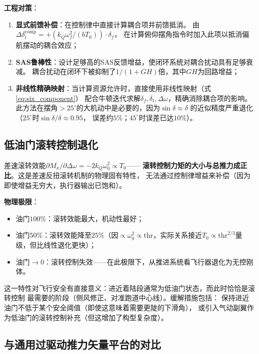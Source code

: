 \documentclass[a4paper,12pt]{ctexart}
\theoremstyle{plain}
\theoremstyle{definition}
\begin{document}
\textbf{工程对策}：
\begin{enumerate}[label=(\arabic*)]
    \item \textbf{显式前馈补偿}：在控制律中直接计算耦合项并前馈抵消。
          由$\Delta \delta_t^{\text{comp}} = +(k_Q \omega_f^2 / (b T_0)) \cdot \delta_f$，
          在计算俯仰摆角指令时加入此项以抵消偏航摆动的耦合效应；
    \item \textbf{SAS鲁棒性}：设计足够高的SAS反馈增益，使闭环系统对耦合扰动具有足够衰减。
          耦合扰动在闭环下被抑制了$1/(1+GH)$倍，其中$GH$为回路增益；
    \item \textbf{非线性精确映射}：当计算资源允许时，直接使用非线性映射（式\ref{eq:six_component}）
          配合牛顿迭代求解$\delta_f, \delta_t, \Delta\omega$，精确消除耦合项的影响。
          此方法在摆角$>25^\circ$的大机动中是必要的，因为$\sin\delta \approx \delta$
          的近似精度严重退化（$25^\circ$时$\sin\delta/\delta \approx 0.95$，
          误差约$5\%$；$45^\circ$时误差已达$10\%$）。
\end{enumerate}

\subsection{低油门滚转控制退化}

差速滚转效能$\partial M_x / \partial \Delta\omega = -2 k_Q \omega_0^2 \propto T_0$——
\textbf{滚转控制力矩的大小与总推力成正比}。这是差速反扭滚转机制的物理固有特性，
无法通过控制律增益来补偿（因为即使增益无穷大，执行器输出已饱和）。

\textbf{物理极限}：
\begin{itemize}
    \item 油门$100\%$：滚转效能最大，机动性最好；
    \item 油门$50\%$：滚转效能降至$25\%$（因$\propto \omega_0^2 \propto \text{thr}$，实际关系接近$T_0 \propto \text{thr}^{2/3}$量级，但比线性退化更快）；
    \item 油门$\to 0$：滚转控制失效——在此极限下，从推进系统看飞行器退化为无控刚体。
\end{itemize}

这一特性对飞行安全有直接意义：进近着陆段通常为低油门状态，而此时恰恰是滚转控制
最需要的阶段（侧风修正、对准跑道中心线）。缓解措施包括：
保持进近油门不低于某个安全阈值（即使这意味着需要更陡的下滑角），
或引入气动副翼作为低油门的滚转控制补充（但这增加了构型复杂度）。

\subsection{与通用过驱动推力矢量平台的对比}
\end{document}
